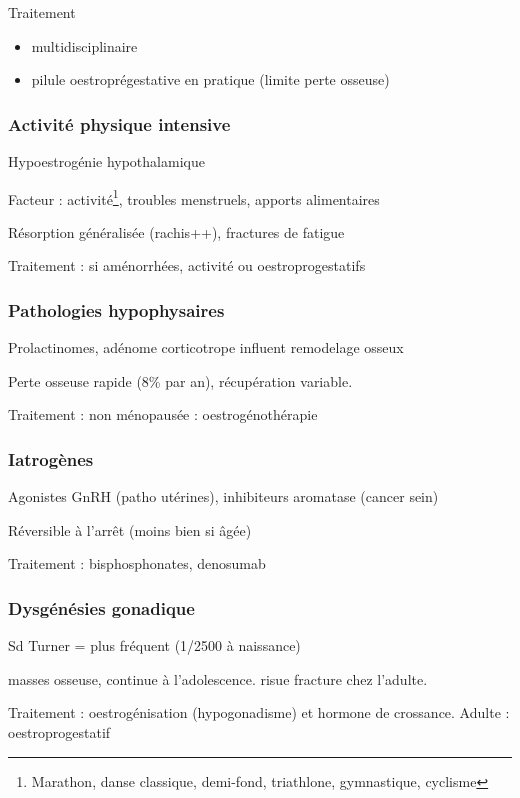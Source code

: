 \documentclass[11pt]{article}
\begin{document}
Traitement 
\begin{itemize}
\item multidisciplinaire
\item pilule oestroprégestative en pratique (limite perte osseuse)
\end{itemize}

\subsubsection{Activité physique intensive}
\label{sec:org0ea3d60}
Hypoestrogénie hypothalamique

Facteur : activité\footnote{Marathon, danse classique, demi-fond, triathlone, gymnastique, cyclisme}, troubles menstruels, apports alimentaires

Résorption généralisée (rachis++), \inc fractures de fatigue

Traitement : si aménorrhées, \dec activité ou oestroprogestatifs

\subsubsection{Pathologies hypophysaires}
\label{sec:org665292b}
Prolactinomes, adénome corticotrope influent remodelage osseux

Perte osseuse rapide (8\% par an), récupération variable.

Traitement : \female non ménopausée : oestrogénothérapie

\subsubsection{Iatrogènes}
\label{sec:org311a904}
Agonistes GnRH (patho utérines), inhibiteurs aromatase (cancer sein)

Réversible à l'arrêt (moins bien si âgée)

Traitement : bisphosphonates, denosumab

\subsubsection{Dysgénésies gonadique}
\label{sec:orgaa2264d}
Sd Turner = plus fréquent (1/2500 à naissance)

\dec masses osseuse, continue à l'adolescence. \inc risue fracture chez
l'adulte.

Traitement : oestrogénisation (hypogonadisme) et hormone de crossance. Adulte :
oestroprogestatif
\end{document}
